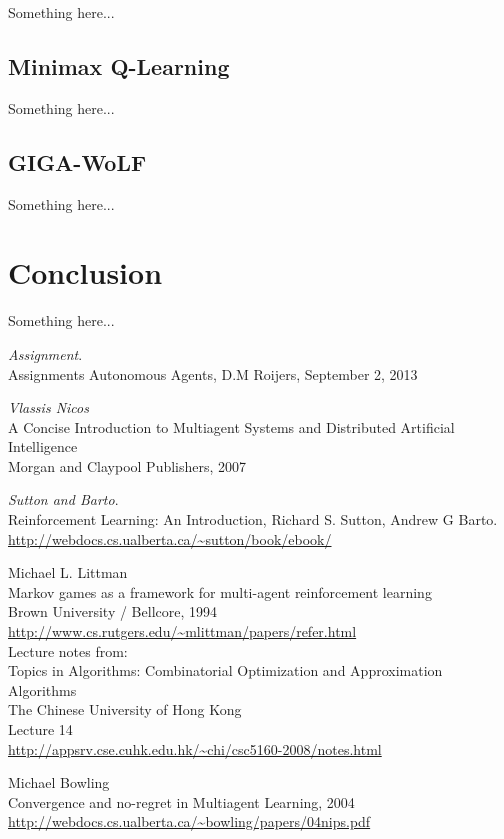 \documentclass[a4paper,12pt]{article}
\begin{document}
Something here...

\subsection{Minimax Q-Learning}

Something here...

\subsection{GIGA-WoLF}

Something here...

\section{Conclusion}

Something here...

\thebibliography{}
  \emph{Assignment}.\\
  Assignments Autonomous Agents, D.M Roijers, September 2, 2013

	\emph{Vlassis Nicos} \\
	A Concise Introduction to Multiagent Systems and Distributed Artificial Intelligence \\
	Morgan and Claypool Publishers, 2007 

  \emph{Sutton and Barto}.\\
  Reinforcement Learning: An Introduction, Richard S. Sutton, Andrew G Barto. \\
  \url{http://webdocs.cs.ualberta.ca/~sutton/book/ebook/}
 
 Michael L. Littman \\
 Markov games as a framework for multi-agent reinforcement learning \\
 Brown University / Bellcore, 1994 \\
 \url{http://www.cs.rutgers.edu/~mlittman/papers/refer.html} \\
 
 Lecture notes from: \\ 
 Topics in Algorithms: Combinatorial Optimization and Approximation Algorithms \\
 The Chinese University of Hong Kong \\
 Lecture 14 \\
 \url{http://appsrv.cse.cuhk.edu.hk/~chi/csc5160-2008/notes.html}
 
 Michael Bowling \\
 Convergence and no-regret in Multiagent Learning, 2004 \\
 \url{http://webdocs.cs.ualberta.ca/~bowling/papers/04nips.pdf}

\end{document}
